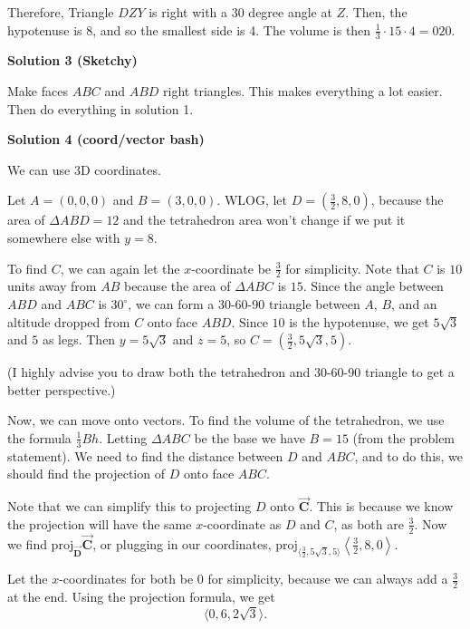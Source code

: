 \begin{enumerate}
 Therefore, Triangle $DZY$ is right with a 30 degree angle at $Z$. Then, the hypotenuse is 8, and so the smallest side is 4. The volume is then $\frac{1}{3} \cdot 15 \cdot 4 = \boxed{020}$.

 



\textbf{Solution 3 (Sketchy)}

Make faces $ABC$ and $ABD$ right triangles. This makes everything a lot easier. Then do everything in solution 1.

 



\textbf{Solution 4 (coord/vector bash)}

We can use 3D coordinates.

 Let $A = (0, 0, 0)$ and $B = (3, 0, 0).$ WLOG, let $D = \left(\frac{3}{2}, 8, 0\right)$, because the area of $\Delta{ABD} = 12$ and the tetrahedron area won't change if we put it somewhere else with $y=8.$

 To find $C$, we can again let the $x$-coordinate be $\frac{3}{2}$ for simplicity. Note that $C$ is $10$ units away from $AB$ because the area of $\Delta{ABC}$ is $15$. Since the angle between $ABD$ and $ABC$ is $30^\circ$, we can form a 30-60-90 triangle between $A$, $B$, and an altitude dropped from $C$ onto face $ABD$. Since $10$ is the hypotenuse, we get $5\sqrt{3}$ and $5$ as legs. Then $y=5\sqrt{3}$ and $z=5$, so $C = \left(\frac{3}{2}, 5\sqrt{3}, 5\right).$

 (I highly advise you to draw both the tetrahedron and 30-60-90 triangle to get a better perspective.)

 Now, we can move onto vectors. To find the volume of the tetrahedron, we use the formula $\frac{1}{3}Bh.$ Letting $\Delta{ABC}$ be the base we have $B = 15$ (from the problem statement). We need to find the distance between $D$ and $ABC$, and to do this, we should find the projection of $D$ onto face $ABC$.

 Note that we can simplify this to projecting $D$ onto $\mathbf{\overrightarrow{C}}.$ This is because we know the projection will have the same $x$-coordinate as $D$ and $C$, as both are $\frac{3}{2}.$ Now we find $\text{proj}_{\mathbf{\overrightarrow{D}}} \mathbf{\overrightarrow{C}}$, or plugging in our coordinates, $\text{proj}_{\langle\frac{3}{2}, 5\sqrt{3}, 5\rangle} \left\langle\frac{3}{2}, 8, 0\right\rangle$. 

 Let the $x$-coordinates for both be $0$ for simplicity, because we can always add a $\frac{3}{2}$ at the end. Using the projection formula, we get 
 \[\langle 0, 6, 2\sqrt{3}\rangle.\]


\end{enumerate}
